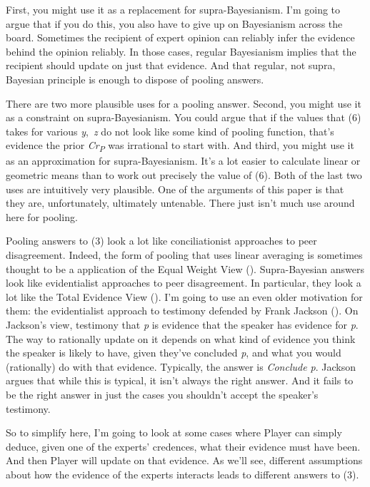 \documentclass[
  11pt,
  letterpaper,
  DIV=11,
  numbers=noendperiod,
  twoside]{scrartcl}
\begin{document}
First, you might use it as a replacement for supra-Bayesianism. I'm
going to argue that if you do this, you also have to give up on
Bayesianism across the board. Sometimes the recipient of expert opinion
can reliably infer the evidence behind the opinion reliably. In those
cases, regular Bayesianism implies that the recipient should update on
just that evidence. And that regular, not supra, Bayesian principle is
enough to dispose of pooling answers.

There are two more plausible uses for a pooling answer. Second, you
might use it as a constraint on supra-Bayesianism. You could argue that
if the values that (6) takes for various \emph{y},~\emph{z} do not look
like some kind of pooling function, that's evidence the prior
\emph{Cr\textsubscript{P}} was irrational to start with. And third, you
might use it as an approximation for supra-Bayesianism. It's a lot
easier to calculate linear or geometric means than to work out precisely
the value of (6). Both of the last two uses are intuitively very
plausible. One of the arguments of this paper is that they are,
unfortunately, ultimately untenable. There just isn't much use around
here for pooling.

Pooling answers to (3) look a lot like conciliationist approaches to
peer disagreement. Indeed, the form of pooling that uses linear
averaging is sometimes thought to be a application of the Equal Weight
View (). Supra-Bayesian answers look
like evidentialist approaches to peer disagreement. In particular, they
look a lot like the Total Evidence View
(). I'm going to use an
even older motivation for them: the evidentialist approach to testimony
defended by Frank Jackson (). On
Jackson's view, testimony that \emph{p} is evidence that the speaker has
evidence for \emph{p}. The way to rationally update on it depends on
what kind of evidence you think the speaker is likely to have, given
they've concluded \emph{p}, and what you would (rationally) do with that
evidence. Typically, the answer is \emph{Conclude p}. Jackson argues
that while this is typical, it isn't always the right answer. And it
fails to be the right answer in just the cases you shouldn't accept the
speaker's testimony.

So to simplify here, I'm going to look at some cases where Player can
simply deduce, given one of the experts' credences, what their evidence
must have been. And then Player will update on that evidence. As we'll
see, different assumptions about how the evidence of the experts
interacts leads to different answers to (3).
\end{document}
